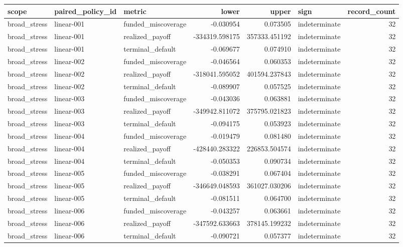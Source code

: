\begin{tabular}{lllrrlr}
\toprule
scope & paired\_policy\_id & metric & lower & upper & sign & record\_count \\
\midrule
broad\_stress & linear-001 & funded\_miscoverage & -0.030954 & 0.073505 & indeterminate & 32 \\
broad\_stress & linear-001 & realized\_payoff & -334319.598175 & 357333.451192 & indeterminate & 32 \\
broad\_stress & linear-001 & terminal\_default & -0.069677 & 0.074910 & indeterminate & 32 \\
broad\_stress & linear-002 & funded\_miscoverage & -0.046564 & 0.060353 & indeterminate & 32 \\
broad\_stress & linear-002 & realized\_payoff & -318041.595052 & 401594.237843 & indeterminate & 32 \\
broad\_stress & linear-002 & terminal\_default & -0.089907 & 0.057525 & indeterminate & 32 \\
broad\_stress & linear-003 & funded\_miscoverage & -0.043036 & 0.063881 & indeterminate & 32 \\
broad\_stress & linear-003 & realized\_payoff & -349942.811072 & 375795.021823 & indeterminate & 32 \\
broad\_stress & linear-003 & terminal\_default & -0.094175 & 0.053923 & indeterminate & 32 \\
broad\_stress & linear-004 & funded\_miscoverage & -0.019479 & 0.081480 & indeterminate & 32 \\
broad\_stress & linear-004 & realized\_payoff & -428440.283322 & 226853.504574 & indeterminate & 32 \\
broad\_stress & linear-004 & terminal\_default & -0.050353 & 0.090734 & indeterminate & 32 \\
broad\_stress & linear-005 & funded\_miscoverage & -0.038291 & 0.067404 & indeterminate & 32 \\
broad\_stress & linear-005 & realized\_payoff & -346649.048593 & 361027.030206 & indeterminate & 32 \\
broad\_stress & linear-005 & terminal\_default & -0.081511 & 0.064700 & indeterminate & 32 \\
broad\_stress & linear-006 & funded\_miscoverage & -0.043257 & 0.063661 & indeterminate & 32 \\
broad\_stress & linear-006 & realized\_payoff & -347592.633663 & 378145.199232 & indeterminate & 32 \\
broad\_stress & linear-006 & terminal\_default & -0.090721 & 0.057377 & indeterminate & 32 \\

\end{tabular}
